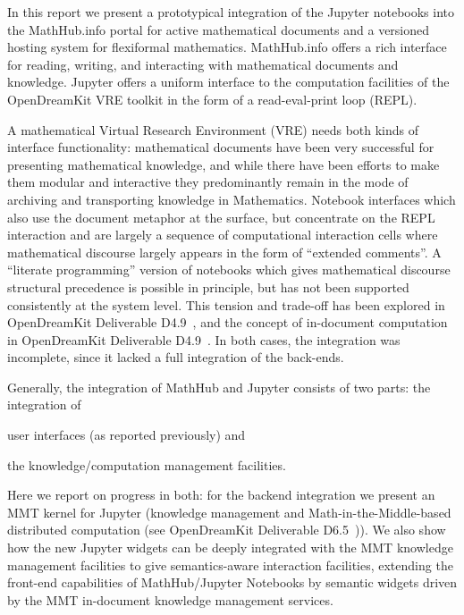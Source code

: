 In this report we present a prototypical integration of the Jupyter notebooks into the MathHub.info portal for active mathematical documents and a versioned hosting system for flexiformal mathematics.
MathHub.info offers a rich interface for reading, writing, and interacting with mathematical documents and knowledge. Jupyter offers a uniform interface to the computation facilities of the OpenDreamKit VRE toolkit in the form of a read-eval-print loop (REPL).

A mathematical Virtual Research Environment (VRE) needs both kinds of interface functionality: mathematical documents have been very successful for presenting mathematical knowledge, and while there have been efforts to make them modular and interactive they predominantly remain in the mode of archiving and transporting knowledge in Mathematics.
Notebook interfaces which also use the document metaphor at the surface, but concentrate on the REPL interaction and are largely a sequence of computational interaction cells where mathematical discourse largely appears in the form of ``extended comments''.
A ``literate programming'' version of notebooks which gives mathematical discourse structural precedence is possible in principle, but has not been supported consistently at the system level.
This tension and trade-off has been explored in OpenDreamKit Deliverable D4.9~\cite{ODK-D4.2}, and the concept of in-document computation in OpenDreamKit Deliverable D4.9~\cite{ODK-D4.9}.
In both cases, the integration was incomplete, since it lacked a full integration of the back-ends. 

Generally, the integration of MathHub and Jupyter consists of two parts: the integration of
\begin{inparaenum}[\em a\rm )]
\item user interfaces (as reported previously) and
\item the knowledge/computation management facilities. 
\end{inparaenum}
Here we report on progress in both: for the backend integration we present an MMT kernel for Jupyter (knowledge management and Math-in-the-Middle-based distributed computation (see OpenDreamKit Deliverable D6.5~\cite{ODK-D6.5})).
We also show how the new Jupyter widgets can be deeply integrated with the MMT knowledge management facilities to give semantics-aware interaction facilities, extending the front-end capabilities of MathHub/Jupyter Notebooks by semantic widgets driven by the MMT in-document knowledge management services.
 
